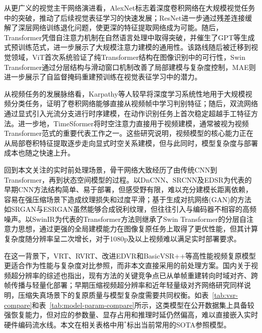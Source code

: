 从更广义的视觉主干网络演进看，AlexNet\cite{Krizhevsky2012ImageNetCW}标志着深度卷积网络在大规模视觉任务中的突破，推动了后续视觉表征学习的快速发展；ResNet\cite{He2015DeepRL}进一步通过残差连接缓解了深层网络训练退化问题，使更深的特征提取网络成为可能。随后，Transformer凭借自注意力机制在自然语言处理中取得突破\cite{Vaswani2017AttentionIA}，并催生了GPT\cite{Radford2018ImprovingLU}等生成式预训练范式，进一步展示了大规模注意力建模的通用性。该路线随后被迁移到视觉领域，ViT\cite{Kolesnikov2020TransformerEM}首次系统验证了纯Transformer结构在图像识别中的可行性，Swin Transformer\cite{Liu2021SwinTH}通过分层结构与滑动窗口机制改善了局部建模与复杂度控制，MAE\cite{He2021MaskedAA}则进一步展示了自监督掩码重建预训练在视觉表征学习中的潜力。

从视频任务的发展脉络看，Karpathy等人\cite{Karpathy2014LargeScaleVC}较早将深度学习系统性地用于大规模视频分类任务，证明了卷积网络能够直接从视频帧中学习判别特征；随后，双流网络\cite{Simonyan2014TwoStreamCN}通过显式引入光流分支进行时序建模，在动作识别任务上首次稳定超越手工特征方法。进一步地，TimeSformer\cite{Bertasius2021IsSA}将时空注意力直接用于视频建模，通常被视为视频Transformer范式的重要代表工作之一。这些研究说明，视频模型的核心能力正在从局部卷积特征提取逐步走向显式时空关系建模，但与此同时，模型复杂度与部署成本也随之快速上升。

回到本文关注的实时前处理场景，骨干网络大致经历了由传统CNN到Transformer，再到状态空间模型的过程。以DnCNN\cite{Zhang2017DnCNN}、SRCNN\cite{ref42-dong2016srcnn}及EDSR\cite{ref43-lim2017edsr}为代表的早期CNN方法结构简单、易于部署，但感受野有限，难以充分建模长距离依赖，容易在强压缩场景下造成纹理损失和过度平滑；基于生成对抗网络(GAN)\cite{ref62-goodfellow2014gan}的方法如SRGAN\cite{ref44-ledig2017srgan}与ESRGAN\cite{ref45-wang2018esrgan}虽然能够合成锐利纹理，但往往引入与编码器不相容的高频噪声。以SwinIR\cite{ref25-liang2021swinir}为代表的Transformer方法则继承了Swin Transformer的分层自注意力思想\cite{Liu2021SwinTH}，通过更强的全局建模能力在图像复原任务上取得了更优性能，但其计算复杂度随分辨率呈二次增长，对于1080p及以上视频难以满足实时部署要求。

在这一背景下，VRT\cite{ref22-liang2022vrt}、RVRT\cite{ref23-liang2022rvrt}、改进EDVR\cite{ref14-huang2022edvr}和BasicVSR++\cite{ref2-chan2021basicvsr,ref24-wang2022basicsr}等高性能视频复原模型更适合作为性能与复杂度对比参照，而非本文直接采用的前处理方案。国内关于视频超分辨率的综述也指出，现有方法的关键竞争点已从单帧重建转向时域对齐、跨帧传播与轻量化部署\cite{ref66-jiang2023vsr}；早期压缩视频超分辨率和近年轻量级对齐网络研究同样说明，压缩失真场景下的复原质量与模型复杂度需要共同权衡\cite{ref69-zhou2006compressedvsr,ref67-jin2022lightvsr}。如表~\ref{tab:vsr-compare}和表~\ref{tab:model-param-compare}所示，这类模型在公开数据集上具备较强恢复能力，但对应的参数量、显存占用和推理时延仍然偏高，难以直接嵌入实时硬件编码流水线。本文在相关表格中用$^{\ast}$标出当前常用的SOTA参照模型。

